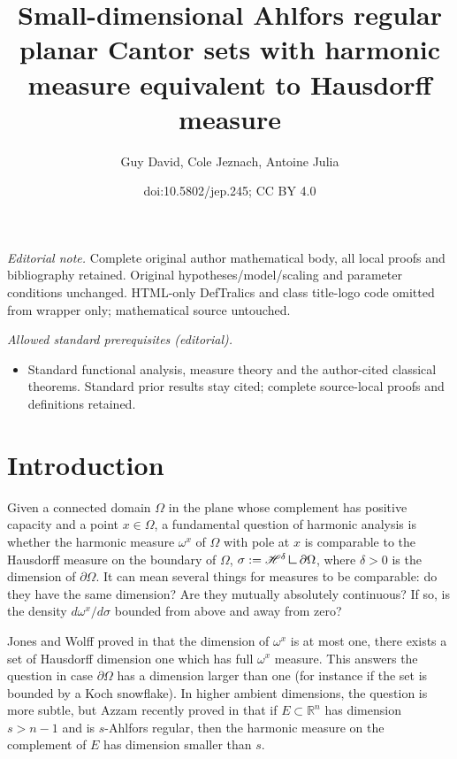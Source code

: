 \documentclass[10pt]{amsart}
\title{Small-dimensional Ahlfors regular planar Cantor sets with harmonic measure equivalent to Hausdorff measure}
\author{Guy David, Cole Jeznach, Antoine Julia}
\date{doi:10.5802/jep.245; CC BY 4.0}
\numberwithin{equation}{section}
\theoremstyle{plain}
\theoremstyle{definition}
\newcommand{\R}{\mathbb{R}}
\newcommand{\mres}{\mathbin{\vrule height 1.6ex depth 0pt width
0.13ex\vrule height 0.13ex depth 0pt width 1.3ex}}
\begin{document}
\maketitle
\noindent\textit{Editorial note.} Complete original author mathematical body, all local proofs and bibliography retained. Original hypotheses/model/scaling and parameter conditions unchanged. HTML-only DefTralics and class title-logo code omitted from wrapper only; mathematical source untouched.\par\medskip
\noindent\textit{Allowed standard prerequisites (editorial).}\begin{itemize}
\item Standard functional analysis, measure theory and the author-cited classical theorems. Standard prior results stay cited; complete source-local proofs and definitions retained.
\end{itemize}\medskip

\tableofcontents


\section{Introduction}\label{S1}
Given a connected domain $\Omega$ in the plane whose complement has positive capacity and a point $x\in \Omega$, a fundamental question of harmonic analysis is whether the harmonic measure $\omega^x$ of $\Omega$ with pole at $x$ is comparable to the Hausdorff measure on the boundary of $\Omega$, $\sigma:= \mathscr{H}^\delta \mres \partial \Omega$, where $\delta>0$ is the dimension of $\partial \Omega$. It can mean several things for measures to be comparable: do they have the same dimension? Are they mutually absolutely continuous? If so, is the density $d\omega^x/d \sigma$ bounded from above and away from zero?

Jones and Wolff proved in \cite{JonesWolff}
that the dimension of $\omega^x$ is at most one, \ie there exists a set of Hausdorff dimension one which has
full $\omega^x$ measure. This answers the question in case $\partial \Omega$ has a
dimension larger than one (for instance if the set is bounded by a Koch snowflake).
In higher ambient dimensions, the question is more subtle, but Azzam recently proved in \cite{Azzam2020} that if $E\subset \R^n$ has dimension $s>n-1$ and is $s$-Ahlfors regular, then the harmonic measure on the complement of $E$ has dimension smaller than $s$.
\end{document}
